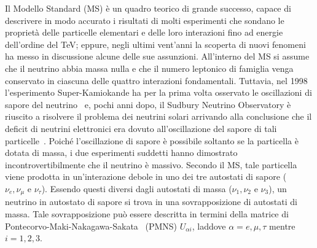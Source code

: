 Il Modello Standard (MS) è un quadro teorico di grande successo, capace di descrivere in modo accurato i risultati di molti esperimenti che sondano le proprietà delle particelle elementari e delle loro interazioni fino ad energie dell'ordine del TeV; eppure, negli ultimi vent'anni la scoperta di nuovi fenomeni ha messo in discussione alcune delle sue assunzioni.
All'interno del MS si assume che il neutrino abbia massa nulla e che il numero leptonico di famiglia venga conservato in ciascuna delle quattro interazioni fondamentali.
Tuttavia, nel 1998 l'esperimento Super-Kamiokande ha per la prima volta osservato le oscillazioni di sapore del neutrino~\cite{fukuda:prl98} e, pochi anni dopo, il Sudbury Neutrino Observatory è riuscito a risolvere il problema dei neutrini solari arrivando alla conclusione che il deficit di neutrini elettronici era dovuto all'oscillazione del sapore di tali particelle~\cite{ahmad:prl01}.
Poiché l'oscillazione di sapore è possibile soltanto se la particella è dotata di massa, i due esperimenti suddetti hanno dimostrato incontrovertibilmente che il neutrino è massivo.
Secondo il MS, tale particella viene prodotta in un'interazione debole in uno dei tre autostati di sapore ($\nu_e, \nu_{\mu} \mbox{ e }  \nu_{\tau}$).
Essendo questi diversi dagli autostati di massa ($\nu_1, \nu_{2} \mbox{ e }  \nu_{3}$), un neutrino in autostato di sapore si trova in una sovrapposizione di autostati di massa.
Tale sovrapposizione può essere descritta in termini della matrice di Pontecorvo-Maki-Nakagawa-Sakata~\cite{maki:ptp62} (PMNS) $U_{\alpha i}$, laddove $\alpha = e, \mu, \tau $ mentre $ i = 1, 2, 3 $.







